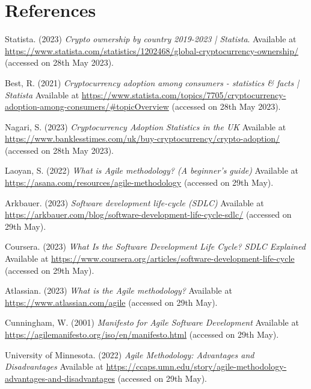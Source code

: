 \section{References}

\noindent [1] Statista. (2023) \textit{Crypto ownership by country 2019-2023 | Statista}. Available at \url{https://www.statista.com/statistics/1202468/global-cryptocurrency-ownership/} (accessed on 28th May 2023).
\vspace{0.2cm}

\noindent [2] Best, R. (2021) \textit{Cryptocurrency adoption among consumers - statistics \& facts | Statista} Available at \url{https://www.statista.com/topics/7705/cryptocurrency-adoption-among-consumers/#topicOverview} (accessed on 28th May 2023).
\vspace{0.2cm}

\noindent [3] Nagari, S. (2023) \textit{Cryptocurrency Adoption Statistics in the UK} Available at \url{https://www.banklesstimes.com/uk/buy-cryptocurrency/crypto-adoption/} (accessed on 28th May 2023).
\vspace{0.2cm}

\noindent [4] Laoyan, S. (2022) \textit{What is Agile methodology? (A beginner's guide)} Available at \url{https://asana.com/resources/agile-methodology} (accessed on 29th May).
\vspace{0.2cm}

\noindent [5] Arkbauer. (2023) \textit{Software development life-cycle (SDLC)} Available at \url{https://arkbauer.com/blog/software-development-life-cycle-sdlc/} (accessed on 29th May).
\vspace{0.2cm}

\noindent [6] Coursera. (2023) \textit{What Is the Software Development Life Cycle? SDLC Explained} Available at \url{https://www.coursera.org/articles/software-development-life-cycle} (accessed on 29th May).
\vspace{0.2cm}

\noindent [7] Atlassian. (2023) \textit{What is the Agile methodology?} Available at \url{https://www.atlassian.com/agile} (accessed on 29th May).
\vspace{0.2cm}

\noindent [8] Cunningham, W. (2001) \textit{Manifesto for Agile Software Development} Available at \url{https://agilemanifesto.org/iso/en/manifesto.html} (accessed on 29th May).
\vspace{0.2cm}

\noindent [9] University of Minnesota. (2022) \textit{Agile Methodology: Advantages and Disadvantages} Available at \url{https://ccaps.umn.edu/story/agile-methodology-advantages-and-disadvantages} (accessed on 29th May).
\vspace{0.2cm}


